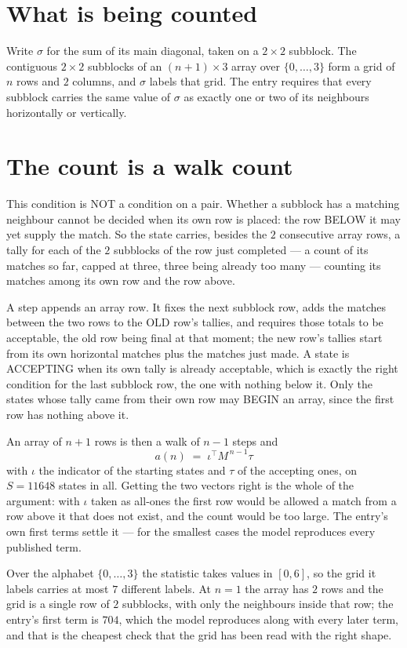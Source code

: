 \documentclass[11pt,a4paper]{article}
\theoremstyle{plain}
\theoremstyle{definition}
\begin{document}
\section{What is being counted}

Write $\sigma$ for the sum of its main diagonal, taken on a $2\times2$ subblock. The contiguous $2\times2$
subblocks of an $(n+1)\times3$ array over $\{0,\dots,3\}$ form a grid of $n$ rows
and $2$ columns, and $\sigma$ labels that grid. The entry
requires that every subblock carries the same value of $\sigma$ as exactly one or two of its neighbours horizontally or vertically.

\section{The count is a walk count}

This condition is NOT a condition on a pair. Whether a subblock has a
matching neighbour cannot be decided when its own row is placed: the row BELOW it may yet
supply the match. So the state carries, besides the $2$ consecutive array rows, a tally for
each of the $2$ subblocks of the row just completed --- a count of its matches so far, capped at three, three being already too many --- counting its matches
among its own row and the row above.

A step appends an array row. It fixes the next subblock row, adds the matches between the two
rows to the OLD row's tallies, and requires those totals to be acceptable, the old row being
final at that moment; the new row's tallies start from its own horizontal matches plus the
matches just made. A state is ACCEPTING when its own tally is already acceptable, which is
exactly the right condition for the last subblock row, the one with nothing below it. Only the
states whose tally came from their own row may BEGIN an array, since the first row has nothing
above it.

An array of $n+1$ rows is then a walk of $n-1$ steps and
\[
a(n)\;=\;\iota^{\!\top}M^{\,n-1}\tau
\]
with $\iota$ the indicator of the starting states and $\tau$ of the accepting ones, on
$S=11648$ states in all. Getting the two vectors right is the whole of the argument: with
$\iota$ taken as all-ones the first row would be allowed a match from a row above it that does
not exist, and the count would be too large. The entry's own first terms settle it --- for
the smallest cases
the model reproduces every published term.

Over the alphabet $\{0,\dots,3\}$ the statistic takes values in $[0,6]$, so the
grid it labels carries at most $7$ different labels. At $n=1$ the array has $2$
rows and the grid is a single row of $2$
subblocks, with only the neighbours inside that row; the entry's first term is
$704$, which the model reproduces along with every later term, and that is the cheapest
check that the grid has been read with the right shape.
\end{document}
